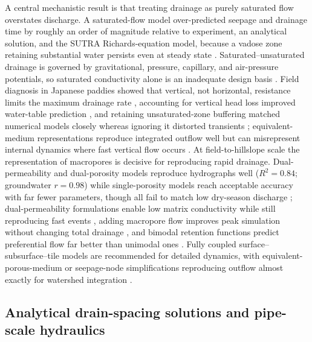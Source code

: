 \documentclass[11pt]{article}
\begin{document}
A central mechanistic result is that treating drainage as purely saturated
flow overstates discharge. A saturated-flow model over-predicted seepage and
drainage time by roughly an order of magnitude relative to experiment, an
analytical solution, and the SUTRA Richards-equation model, because a vadose
zone retaining substantial water persists even at steady state
\parencite{Xin2016b}. Saturated--unsaturated drainage is governed by
gravitational, pressure, capillary, and air-pressure potentials, so saturated
conductivity alone is an inadequate design basis \parencite{Li2021}. Field
diagnosis in Japanese paddies showed that vertical, not horizontal, resistance
limits the maximum drainage rate \parencite{Nishida2020}, accounting for
vertical head loss improved water-table prediction \parencite{Talukolaee2022},
and retaining unsaturated-zone buffering matched numerical models closely
whereas ignoring it distorted transients \parencite{VandeCraats2021};
equivalent-medium representations reproduce integrated outflow well but can
misrepresent internal dynamics where fast vertical flow occurs
\parencite{Carlier2007}. At field-to-hillslope scale the representation of
macropores is decisive for reproducing rapid drainage. Dual-permeability and
dual-porosity models reproduce hydrographs well ($R^2=0.84$; groundwater
$r=0.98$) while single-porosity models reach acceptable accuracy with far
fewer parameters, though all fail to match low dry-season discharge
\parencite{Varvaris2018}; dual-permeability formulations enable low matrix
conductivity while still reproducing fast events
\parencite{Warsta2014,Salo2017,Koivusalo1999}, adding macropore flow improves
peak simulation without changing total drainage \parencite{Zhou2013}, and
bimodal retention functions predict preferential flow far better than unimodal
ones \parencite{Mohanty1997}. Fully coupled surface--subsurface--tile models
are recommended for detailed dynamics, with equivalent-porous-medium or
seepage-node simplifications reproducing outflow almost exactly for watershed
integration \parencite{DeSchepper2015,Boico2022,Xian2017}.

\subsection{Analytical drain-spacing solutions and pipe-scale hydraulics}
\end{document}
